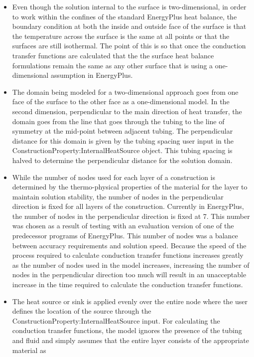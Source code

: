 \begin{itemize}
\item
Even though the solution internal to the surface is two-dimensional, in order to work within the confines of the standard EnergyPlus heat balance, the boundary condition at both the inside and outside face of the surface is that the temperature across the surface is the same at all points or that the surfaces are still isothermal.  The point of this is so that once the conduction transfer functions are calculated that the the surface heat balance formulations remain the same as any other surface that is using a one-dimensional assumption in EnergyPlus.
\item
The domain being modeled for a two-dimensional approach goes from one face of
the surface to the other face as a one-dimensional model.  In the second
dimension, perpendicular to the main direction of heat transfer, the domain
goes from the line that goes through the tubing to the line of symmetry at the
mid-point between adjacent tubing.  The perpendicular distance for this domain
is given by the tubing spacing user input in the
ConstructionProperty:InternalHeatSource object.  This tubing spacing is halved
to determine the perpendicular distance for the solution domain.
\item
While the number of nodes used for each layer of a construction is determined by the thermo-physical properties of the material for the layer to maintain solution stability, the number of nodes in the perpendicular direction is fixed for all layers of the construction.  Currently in EnergyPlus, the number of nodes in the perpendicular direction is fixed at 7.  This number was chosen as a result of testing with an evaluation version of one of the predecessor programs of EnergyPlus.  This number of nodes was a balance between accuracy requirements and solution speed.  Because the speed of the process required to calculate conduction transfer functions increases greatly as the number of nodes used in the model increases, increasing the number of nodes in the perpendicular direction too much will result in an unacceptable increase in the time required to calculate the conduction transfer functions.
\item
The heat source or sink is applied evenly over the entire node where the user
defines the location of the source through the
ConstructionProperty:InternalHeatSource input.  For calculating the conduction
transfer functions, the model ignores the presence of the tubing and fluid and
simply assumes that the entire layer consists of the appropriate material as

\end{itemize}
